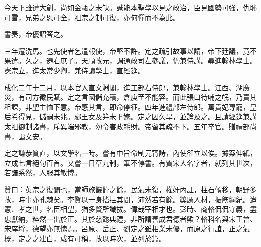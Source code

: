 \begin{pinyinscope}
今天下雖遭大創，尚如金甌之未缺。誠能本聖學以見之政治，臣見國勢可強，仇恥可雪，兄弟之恩可全，祖宗之制可復，亦何憚而不為此。

書奏，帝優詔答之。

三年遷洗馬。也先使者乞遣報使，帝堅不許。定之疏引故事以請，帝下廷議，竟不果遣。久之，遷右庶子。天順改元，調通政司左參議，仍兼侍講。尋進翰林學士。憲宗立，進太常少卿，兼侍讀學士，直經筵。

成化二年十二月，以本官入直文淵閣，進工部右侍郎，兼翰林學士。江西、湖廣災，有司方徵民賦。定之言國儲充積，倉庾至不能容。而此張口待哺之氓，乃責其租課，非聖主恤下意。帝感其言，即命停征。四年進禮部左侍郎。萬貴妃專寵，皇后希得見，儲嗣未兆。郕王女及笄未下嫁。定之因久旱，並論及之。且請經筵兼講太祖御制諸書，斥異端邪教，勿令害政耗財。帝留其疏不下。五年卒官。贈禮部尚書，謚文安。

定之謙恭質直，以文學名一時。嘗有中旨命制元宵詩，內使卻立以俟。據案伸紙，立成七言絕句百首。又嘗一日草九制，筆不停書。有質宋人名字者，就列其世次，若譜系然，人服其敏博。

贊曰：英宗之復闢也，當師旅饑饉之餘，民氣未復，權奸內訌，柱石傾移，朝野多故，時事亦孔棘矣。李賢以一身搘拄其間，沛然若有餘。獎厲人材，振飭綱紀。迨憲、孝之世，名臣相望，猶多賢所識拔。偉哉宰相才也。彭時、商輅侃侃守義，盡忠獻納，粹然一出於正。其於慈懿典禮，非所謂善成君德者歟？輅科名與宋王曾、宋庠埒，德望亦無愧焉。呂原、岳正、劉定之雖相業未優，而原之行誼，正之氣概，定之之建白，咸有可稱，故以時次，並列於篇。


\end{pinyinscope}